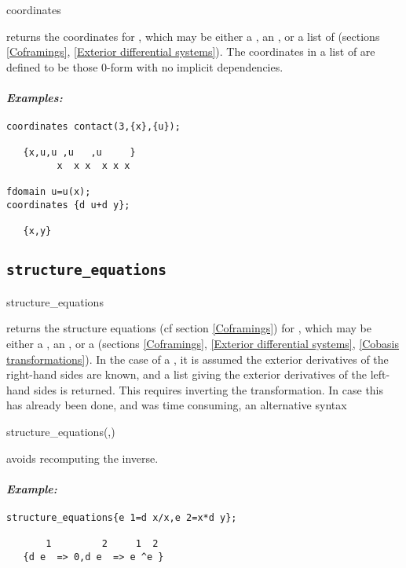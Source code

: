\begin{syntax}
	coordinates 
\end{syntax}
returns the coordinates for , which may be either a
, an , or a list of  (sections
\ref{Coframings}, \ref{Exterior differential systems}). The coordinates in a
list of  are defined to be those 0-form  with no
implicit dependencies.

\paragraph{\it Examples:}
\begin{verbatim}
coordinates contact(3,{x},{u});

   {x,u,u ,u   ,u     }
         x  x x  x x x 

fdomain u=u(x);
coordinates {d u+d y};

   {x,y} 
\end{verbatim}

\subsection{\tt structure\_equations}
\label{structure_equations}

\begin{syntax}
	structure\_equations 
\end{syntax}
returns the structure equations (cf section \ref{Coframings}) for
, which may be either a , an , or a
 (sections \ref{Coframings}, \ref{Exterior differential
systems}, \ref{Cobasis transformations}). In the case of a
, it is assumed the exterior derivatives of the right-hand
sides are known, and a list giving the exterior derivatives of the
left-hand sides is returned. This requires inverting the transformation. In
case this has already been done, and was time consuming, an alternative
syntax
\begin{syntax}
	structure\_equations(,)
\end{syntax}
avoids recomputing the inverse.

\paragraph{\it Example:}
\begin{verbatim}
structure_equations{e 1=d x/x,e 2=x*d y};

       1         2     1  2
   {d e  => 0,d e  => e ^e } 
\end{verbatim}

